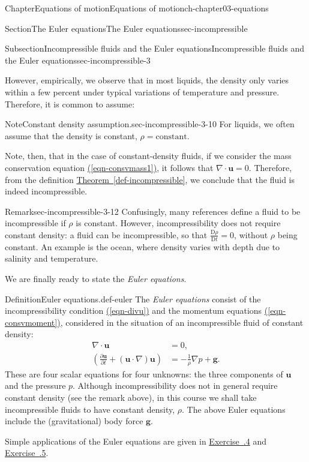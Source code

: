 \documentclass[oneside,10pt,]{book}
\newcommand{\xreffont}{\relax}
\numberwithin{equation}{section}
\newcommand{\DD}[2]{\frac{\mathrm{D}#1}{\mathrm{D}#2}}
\newcommand{\pd}[2]{\frac{\partial#1}{\partial#2}}
\newcommand{\bu}{\boldsymbol{u}}
\newcommand{\bg}{\boldsymbol{g}}
\begin{document}
\begin{chapterptx}{Chapter}{Equations of motion}{}{Equations of motion}{}{}{ch-chapter03-equations}
\begin{sectionptx}{Section}{The Euler equations}{}{The Euler equations}{}{}{sec-incompressible}
\begin{subsectionptx}{Subsection}{Incompressible fluids and the Euler equations}{}{Incompressible fluids and the Euler equations}{}{}{sec-incompressible-3}
\par
However, empirically, we observe that in most liquids, the density only varies within a few percent under typical variations of temperature and pressure. Therefore, it is common to assume:%
\begin{note}{Note}{Constant density assumption.}{sec-incompressible-3-10}%
For liquids, we often assume that the density is constant, \(\rho =
\textrm{constant}\).%
\end{note}
Note, then, that in the case of constant-density fluids, if we consider the mass conservation equation \hyperref[eqn-consvmass1]{({\xreffont\ref{eqn-consvmass1}})}, it follows that \(\nabla \cdot \bu = 0\). Therefore, from the definition \hyperref[def-incompressible]{Theorem~{\xreffont\ref{def-incompressible}}}, we conclude that the fluid is indeed incompressible.%
\begin{remark}{Remark}{}{sec-incompressible-3-12}%
Confusingly, many references define a fluid to be incompressible if \(\rho\) is constant. However, incompressibility does not require constant density: a fluid can be incompressible, so that \(\DD{\rho}{t} = 0\), without \(\rho\) being constant. An example is the ocean, where density varies with depth due to salinity and temperature.%
\end{remark}
We are finally ready to state the \emph{Euler equations}.%
\begin{definition}{Definition}{Euler equations.}{}{def-euler}%
The \emph{Euler equations} consist of the incompressibility condition \hyperref[eqn-divu]{({\xreffont\ref{eqn-divu}})} and the momentum equations \hyperref[eqn-consvmoment]{({\xreffont\ref{eqn-consvmoment}})}, considered in the situation of an incompressible fluid of constant density:%
\begin{align}
\nabla \cdot \bu &= 0, \label{def-euler-2-1-4-1}\\
\left(\pd{\bu}{t} + (\bu \cdot \nabla)\bu\right) &= - \frac{1}{\rho}\nabla p +
\bg.\label{eqn-euler-momentum}
\end{align}
These are four scalar equations for four unknowns: the three components of \(\bu\) and the pressure \(p\). Although incompressibility does not in general require constant density (see the remark above), in this course we shall take incompressible fluids to have constant density, \(\rho\). The above Euler equations include the (gravitational) body force \(\bg\).%
\end{definition}
Simple applications of the Euler equations are given in \hyperlink{ex-hw-fluid-pressure-uniform-velocity}{Exercise~{\xreffont 3.6.4}} and \hyperlink{ex-hw-piston-fluid-problem}{Exercise~{\xreffont 3.6.5}}.%

\end{subsectionptx}
\end{sectionptx}
\end{chapterptx}
\end{document}
